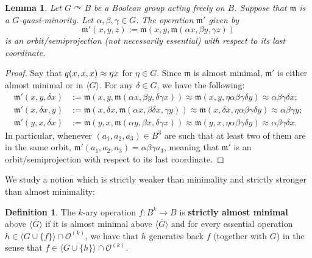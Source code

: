 \documentclass{article}
\newtheorem{lemma}[theorem]{Lemma}
\theoremstyle{remark}
\theoremstyle{definition}
\newtheorem{definition}[theorem]{Definition}
\def\acts{\curvearrowright}
\begin{document}
\begin{lemma}\label{obstacle1}  Let $G\acts B$ be a Boolean group acting freely on $B$. Suppose that $\mathfrak{m}$ is a $G$-quasi-minority. Let $\alpha, \beta, \gamma\in G$. The operation $\mathfrak{m}'$ given by
\[\mathfrak{m}'(x,y,z):=\mathfrak{m}(x,y,\mathfrak{m}(\alpha x,\beta y,\gamma z))\]
is an orbit\-/semiprojection (not necessarily essential) with respect to its last coordinate.
\end{lemma}
\begin{proof} Say that $\mathfrak \mathfrak{q}(x,x,x)\approx \eta x$ for $\eta\in G$. Since $\mathfrak m$ is almost minimal, $\mathfrak m'$ is either almost minimal or in $\langle G\rangle$. For any $\delta\in G$, we have the following:
\begin{align*}
    \mathfrak{m}'(x,y,\delta x) &:=\mathfrak{m}(x, y, \mathfrak{m}(\alpha x,\beta y, \delta \gamma x))\approx 
    \mathfrak{m}(x, y, \eta  \alpha\beta \gamma \delta y)\approx \alpha\beta \gamma\delta  x;\\
    \mathfrak{m}'(x,\delta x, y) &:=\mathfrak{m}(x, \delta x, \mathfrak{m}(\alpha x, \beta \delta x, \gamma y))\approx
    \mathfrak{m}(x, \delta x, \eta\alpha\beta \gamma \delta y) \approx \alpha\beta \gamma y;
  \\
    \mathfrak{m}'(y, x, \delta x) &:=\mathfrak{m}(y, x, \mathfrak{m}(\alpha y,\beta x, \delta \gamma x))\approx \mathfrak{m}(y, x, \eta\alpha\beta \gamma \delta y)\approx \alpha\beta \gamma \delta x.
\end{align*}
In particular, whenever $(a_1,a_2, a_3)\in B^3$ are such that at least two of them are in the same orbit, $\mathfrak{m}'(a_1, a_2, a_3)=\alpha\beta\gamma a_3$, meaning that $\mathfrak m'$ is an orbit\-/semiprojection with respect to its last coordinate.
\end{proof}





We study a notion which is strictly weaker than minimality and strictly stronger than almost minimality:

\begin{definition}\label{def:semimin} The $k$-ary operation $f:B^k\to B$ is \textbf{strictly almost minimal} above $\overline{\langle G\rangle}$ if it is almost minimal above $\overline{\langle G\rangle}$ and for every essential operation $h\in\overline{\langle G \cup\{f\}\rangle}\cap \mathcal{O}^{(k)}$, we have that $h$  generates back $f$ (together with $G$) in the sense that $f\in\overline{\langle G \cup\{h\}\rangle}\cap \mathcal{O}^{(k)}$.
\end{definition}
\end{document}
